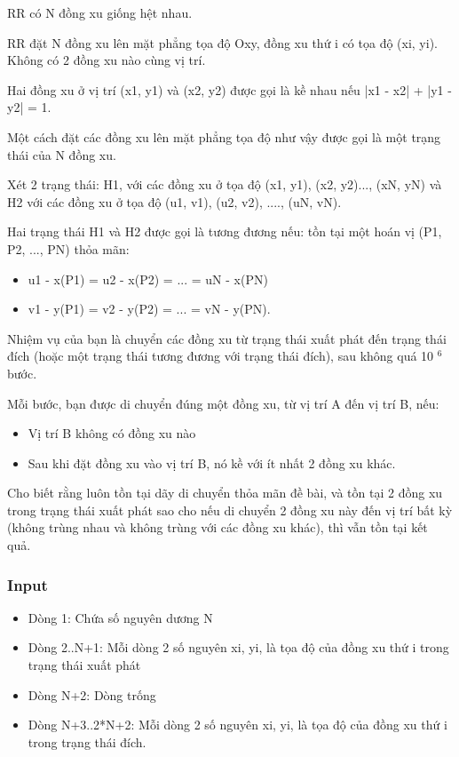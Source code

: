 



   RR có N đồng xu giống hệt nhau.  

    RR đặt N đồng xu lên mặt phẳng tọa độ Oxy, đồng xu thứ i có tọa độ (xi, yi). Không có 2 đồng xu nào cùng vị trí.   

   Hai đồng xu ở vị trí (x1, y1) và (x2, y2) được gọi là kề nhau nếu |x1 - x2| + |y1 - y2| = 1.  

   Một cách đặt các đồng xu lên mặt phẳng tọa độ như vậy được gọi là một trạng thái của N đồng xu.  

   Xét 2 trạng thái: H1, với các đồng xu ở tọa độ (x1, y1), (x2, y2)..., (xN, yN) và H2 với các đồng xu ở tọa độ (u1, v1), (u2, v2), ...., (uN, vN).  

   Hai trạng thái H1 và H2 được gọi là tương đương nếu: tồn tại một hoán vị (P1, P2, ..., PN) thỏa mãn:  
\begin{itemize}
	\item     u1 - x(P1) = u2 - x(P2) = ... = uN - x(PN)   
	\item     v1 - y(P1) = v2 - y(P2) = ... = vN - y(PN).   
\end{itemize}

   Nhiệm vụ của bạn là chuyển các đồng xu từ trạng thái xuất phát đến trạng thái đích (hoặc một trạng thái tương đương với trạng thái đích), sau không quá 10   $^    6   $   bước.  

   Mỗi bước, bạn được di chuyển đúng một đồng xu, từ vị trí A đến vị trí B, nếu:  
\begin{itemize}
	\item     Vị trí B không có đồng xu nào   
	\item     Sau khi đặt đồng xu vào vị trí B, nó kề với ít nhất 2 đồng xu khác.   
\end{itemize}

   Cho biết rằng luôn tồn tại dãy di chuyển thỏa mãn đề bài, và tồn tại 2 đồng xu trong trạng thái xuất phát sao cho nếu di chuyển 2 đồng xu này đến vị trí bất kỳ (không trùng nhau và không trùng với các đồng xu khác), thì vẫn tồn tại kết quả.  

\subsubsection{   Input  }
\begin{itemize}
	\item     Dòng 1: Chứa số nguyên dương N   
	\item     Dòng 2..N+1: Mỗi dòng 2 số nguyên xi, yi, là tọa độ của đồng xu thứ i trong trạng thái xuất phát   
	\item     Dòng N+2: Dòng trống   
	\item     Dòng N+3..2*N+2: Mỗi dòng 2 số nguyên xi, yi, là tọa độ của đồng xu thứ i trong trạng thái đích.   
\end{itemize}

